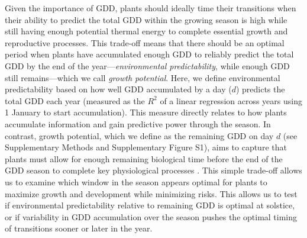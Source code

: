 \documentclass[11pt,letter]{article}
\begin{document}
Given the importance of GDD, plants should ideally time their transitions when their ability to predict the total GDD within the growing season is high while still having enough potential thermal energy to complete essential growth and reproductive processes. This trade-off means that there should be an optimal period when plants have accumulated enough GDD to reliably predict the total GDD by the end of the year---\emph{environmental predictability}, while enough GDD still remains---which we call \emph{growth potential}. Here, we define environmental predictability based on how well GDD accumulated by a day ($d$) predicts the total GDD each year (measured as the $R^2$ of a linear regression across years using 1 January to start accumulation). This measure directly relates to how plants accumulate information and gain predictive power through the season.
In contrast, growth potential, which we define as the remaining GDD on day $d$ (see Supplementary Methods and Supplementary Figure S1), aims to capture that plants must allow for enough remaining biological time before the end of the GDD season to complete key physiological processes \citep{Zohner2023, Journe2024}. This simple trade-off allows us to examine which window in the season appears optimal for plants to maximize growth and development while minimizing risks. This allows us to test if environmental predictability relative to remaining GDD is optimal at solstice, or if variability in GDD accumulation over the season pushes the optimal timing of transitions sooner or later in the year. 
\end{document}
